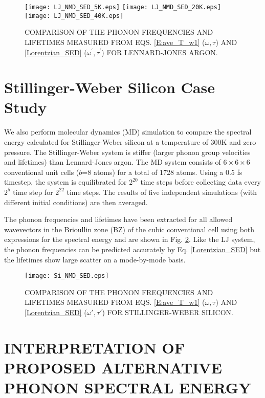 \documentclass[twocolumn,10pt]{asme2e}
\begin{document}
\begin{figure}
\begin{center}
\texttt{[image: LJ\_NMD\_SED\_5K.eps]}
\texttt{[image: LJ\_NMD\_SED\_20K.eps]}
\texttt{[image: LJ\_NMD\_SED\_40K.eps]}
\end{center}
\caption{\label{F:FREQ_LIFE_LJ} COMPARISON OF THE PHONON FREQUENCIES AND LIFETIMES MEASURED FROM EQS$.$ \eqref{E:ave_T_w1} ($\omega,\tau$) AND \eqref{Lorentzian_SED} ($\omega^{'},\tau^{'}$) FOR LENNARD-JONES ARGON.}
\vspace*{-5mm}
\end{figure}

\section*{Stillinger-Weber Silicon Case Study}\label{S:Si_Case_study}

We also perform molecular dynamics (MD) simulation to compare the spectral energy calculated for Stillinger-Weber silicon \cite{stillinger1985} at a temperature of $300$K and zero pressure. The Stillinger-Weber system is stiffer (larger phonon group velocities and lifetimes) than Lennard-Jones argon. The MD system consists
of $6\times 6\times 6$ conventional unit cells ($b$=8 atoms) for a total of 1728 atoms.
Using a 0.5 fs timestep, the system is equilibrated for $2^{20}$ time steps before collecting data every $2^5$ time step for $2^{22}$ time steps. The results of five independent simulations (with different initial conditions) are then averaged.

The phonon frequencies and lifetimes have been extracted for all allowed wavevectors in the Brioullin zone (BZ) of the cubic conventional cell using both expressions for the spectral energy and are shown in Fig. \ref{F:FREQ_LIFE_Si}. Like the LJ system, the phonon frequencies can be predicted accurately by Eq$.$ \eqref{Lorentzian_SED} but the lifetimes show large scatter on a mode-by-mode basis.

\begin{figure}
\texttt{[image: Si\_NMD\_SED.eps]}
\caption{\label{F:FREQ_LIFE_Si} COMPARISON OF THE PHONON FREQUENCIES AND LIFETIMES MEASURED FROM EQS$.$ \eqref{E:ave_T_w1} ($\omega,\tau$) AND  \eqref{Lorentzian_SED} ($\omega',\tau'$) FOR STILLINGER-WEBER SILICON.}
\vspace*{-5mm}
\end{figure}

\section*{INTERPRETATION OF PROPOSED ALTERNATIVE PHONON SPECTRAL ENERGY}\label{S:CNT_Case_study}
\end{document}
